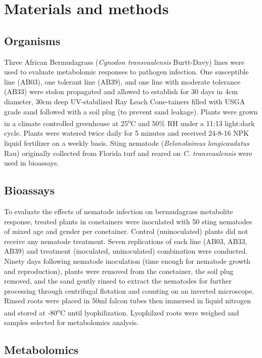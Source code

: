 \documentclass[9pt,lineno]{elife}
\begin{document}
\section{Materials and methods}


\subsection{Organisms}

Three African Bermudagrass (\textit{Cynodon transvaalensis} Burtt-Davy) lines were used to evaluate metabolomic responses to pathogen infection.  One susceptible line (AB03), one tolerant line (AB39), and one line with moderate tolerance (AB33) were stolon propagated and allowed to establish for 30 days in 4cm diameter, 30cm deep UV-stabilized Ray Leach Cone-tainers filled with USGA grade sand followed with a soil plug (to prevent sand leakage). Plants were grown in a climate controlled greenhouse at 25\textsuperscript{o}C and 50\% RH under a 11:13 light:dark cycle.  Plants were watered twice daily for 5 minutes and received 24-8-16 NPK liquid fertilizer on a weekly basis.  Sting nematode (\textit{Belonolaimus longicaudatus} Rau) originally collected from Florida turf and reared on \textit{C. transvaalensis} were used in bioassays. 

\subsection{Bioassays}

To evaluate the effects of nematode infection on bermudagrass metabolite response, treated plants in conetainers were inoculated with 50 sting nematodes of mixed age and gender per conetainer.  Control (uninoculated) plants did not receive any nematode treatment. Seven replications of each line (AB03, AB33, AB39) and treatment (inoculated, uninoculated) combination were conducted.  Ninety days following nematode inoculation (time enough for nematode growth and reproduction), plants were removed from the conetainer, the soil plug removed, and the sand gently rinsed to extract the nematodes for further processing through centrifugal flotation and counting on an inverted microscope.  Rinsed roots were placed in 50ml falcon tubes then immersed in liquid nitrogen and stored at -80\textsuperscript{o}C until lyophilization.  Lyophilzed roots were weighed and samples selected for metabolomics analysis. 

\subsection{Metabolomics}
\end{document}
